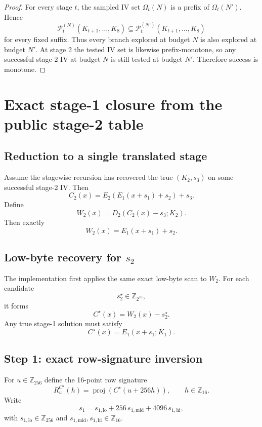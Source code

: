 \documentclass[11pt]{article}
\newcommand{\Z}[1]{\mathbb{Z}_{#1}}
\newcommand{\proj}{\operatorname{proj}}
\begin{document}
\begin{proof}
For every stage $t$, the sampled IV set $\Omega_t(N)$ is a prefix of $\Omega_t(N')$. Hence
\[
\mathcal{P}_t^{(N)}(K_{t+1},\dots,K_8)
\subseteq
\mathcal{P}_t^{(N')}(K_{t+1},\dots,K_8)
\]
for every fixed suffix. Thus every branch explored at budget $N$ is also explored at budget $N'$. At stage 2 the tested IV set is likewise prefix-monotone, so any successful stage-2 IV at budget $N$ is still tested at budget $N'$. Therefore success is monotone.
\end{proof}

\section{Exact stage-1 closure from the public stage-2 table}
\subsection{Reduction to a single translated stage}
Assume the stagewise recursion has recovered the true $(K_2,s_3)$ on some successful stage-2 IV. Then
\[
C_2(x)=E_2(E_1(x+s_1)+s_2)+s_3.
\]
Define
\[
W_2(x)=D_2(C_2(x)-s_3;K_2).
\]
Then exactly
\begin{equation}
\label{eq:stage1-reduction}
W_2(x)=E_1(x+s_1)+s_2.
\end{equation}

\subsection{Low-byte recovery for \texorpdfstring{$s_2$}{s2}}
The implementation first applies the same exact low-byte scan to $W_2$. For each candidate
\[
s_2^\star\in\Z{2^{16}},
\]
it forms
\[
C^\star(x)=W_2(x)-s_2^\star.
\]
Any true stage-1 solution must satisfy
\[
C^\star(x)=E_1(x+s_1;K_1).
\]

\subsection{Step 1: exact row-signature inversion}
For $u\in\Z{256}$ define the 16-point row signature
\[
R_u^{C^\star}(h)=\proj(C^\star(u+256h)),
\qquad h\in\Z{16}.
\]
Write
\[
s_1=s_{1,\mathrm{lo}}+256\,s_{1,\mathrm{mid}}+4096\,s_{1,\mathrm{hi}},
\]
with $s_{1,\mathrm{lo}}\in\Z{256}$ and $s_{1,\mathrm{mid}},s_{1,\mathrm{hi}}\in\Z{16}$.
\end{document}
